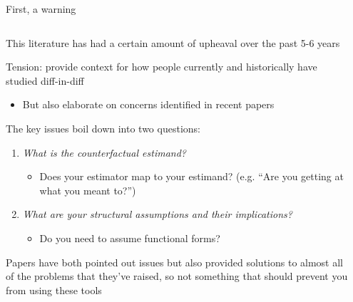 \documentclass[notes,11pt, aspectratio=169]{beamer}
\newenvironment{wideitemize}{\itemize\addtolength{\itemsep}{10pt}}{\enditemize}
\begin{document}
\begin{frame}{First, a warning}
  \begin{columns}[T] %
    \begin{column}{.99\textwidth}
      \begin{wideitemize}
      \item This literature has had a certain amount of upheaval over the
        past 5-6 years
      \item Tension: provide context for how people currently and
        historically have studied diff-in-diff
        \begin{itemize}
        \item But also elaborate on concerns identified in recent papers
        \end{itemize}
      \item The key issues boil down into two questions:
        \begin{enumerate}
        \item \emph{What is the counterfactual estimand?}
          \begin{itemize}
            \item Does your estimator map to your estimand? (e.g. ``Are you getting at what you meant to?'')
          \end{itemize}
        \item \emph{What are your structural assumptions and their implications?}
          \begin{itemize}
          \item Do you need to assume functional forms? 
          \end{itemize}
        \end{enumerate}
      \item Papers have both pointed out issues but also provided
        solutions to almost all of the problems that they've raised,
        so not something that should prevent you from using these
        tools
      \end{wideitemize}
    \end{column}%
    \hfill%
    \begin{column}{.38\textwidth}
      
    \end{column}%
  \end{columns}
\end{frame}
\end{document}
